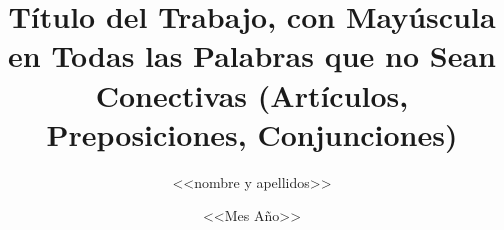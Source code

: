 
\newcommand{\NombreAutor}{ <<nombre y apellidos>> }

\newcommand{\Grado}{ <<título del grado>> }

\newcommand{\TituloTFG}{ Título del Trabajo, con Mayúscula en Todas las Palabras que no Sean Conectivas (Artículos, Preposiciones, Conjunciones)}

\newcommand{\NombreTutor}{ <<nombre y apellidos>> }

\newcommand{\Departamento}{ <<departamento>> }

\newcommand{\Fecha}{ <<Mes  Año>> }

\title{\TituloTFG}
\author{\NombreAutor}
\date{\Fecha}
